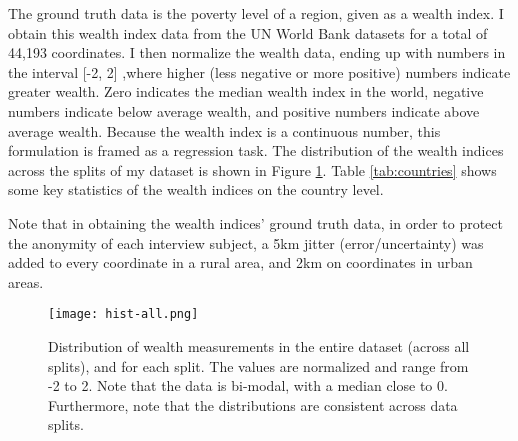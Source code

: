 \documentclass{article}
\begin{document}
The ground truth data is the poverty level of a region, given as a wealth index. I obtain this wealth index data from the UN World Bank datasets \cite{eighteen} for a total of 44,193 coordinates. I then normalize the wealth data, ending up with numbers in the interval [-2, 2] ,where higher (less negative or more positive) numbers indicate greater wealth. Zero indicates the median wealth index in the world, negative numbers indicate below average wealth, and positive numbers indicate above average wealth. Because the wealth index is a continuous number, this formulation is framed as a regression task. The distribution of the wealth indices across the splits of my dataset is shown in Figure  \ref{Poverty_dataset}. Table \ref{tab:countries} shows some key statistics of the wealth indices on the country level.

Note that in obtaining the wealth indices' ground truth data, in order to protect the anonymity of each interview subject, a 5km jitter (error/uncertainty) was added to every coordinate in a rural area, and 2km on coordinates in urban areas.

\begin{figure}[t]
    \centering
    \texttt{[image: hist-all.png]}
    \caption{Distribution of wealth measurements in the entire dataset (across all splits), and for  each split. The values are normalized and range from -2 to 2. Note that the data is bi-modal, with a median close to 0. Furthermore, note that the distributions are consistent across data splits. }
    \label{Poverty_dataset}
\end{figure}
\end{document}
